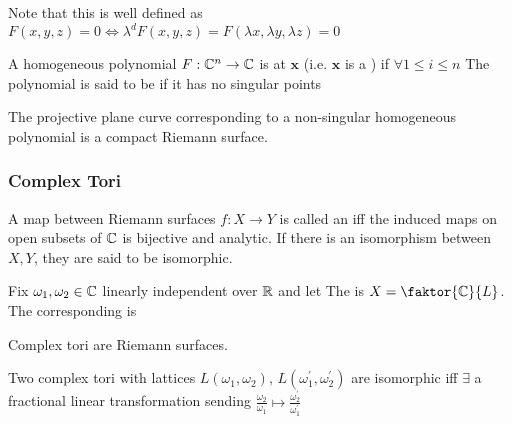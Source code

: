 \documentclass{article}
\begin{document}
\begin{remark}
	Note that this is well defined as $F(x,y,z) = 0 \Leftrightarrow \lambda^d F(x,y,z)=F(\lambda x, \lambda y, \lambda z)=0$
\end{remark}

\begin{definition}
	A homogeneous polynomial $F:\mathbb{C}^n \to \mathbb{C}$ is  at $\bm{x}$ (i.e. $\bm{x}$ is a ) if $\forall 1 \leq i \leq n$
The polynomial is said to be  if it has no singular points
\end{definition}

\begin{prop}
	The projective plane curve corresponding to a non-singular homogeneous polynomial is a compact Riemann surface. 
\end{prop}

\subsubsection{Complex Tori}

\begin{definition}
	A map between Riemann surfaces $f:X \to Y$ is called an  iff the induced maps on open subsets of $\mathbb{C}$ is bijective and analytic. If there is an isomorphism between $X,Y$, they are said to be isomorphic.  
\end{definition}

\begin{definition}
	Fix $\omega_1, \omega_2 \in \mathbb{C}$ linearly independent over $\mathbb{R}$ and let 
The  is $X = \faktor{\mbb{C}}{L}$. The corresponding  is 
\eq{
\mf{F} = \mf{F}(X) = \pbrace{\alpha \omega_1+ \beta \omega_2 \, | \, \alpha,\beta \in [0,1)}
}
\end{definition}

\begin{prop}
	Complex tori are Riemann surfaces. 
\end{prop}

\begin{prop}
	Two complex tori with lattices $L(\omega_1, \omega_2), \, L(\omega_1^\prime, \omega_2^\prime)$ are isomorphic iff $\exists$ a fractional linear transformation sending $\frac{\omega_2}{\omega_1} \mapsto \frac{\omega_2^\prime}{\omega_1^\prime}$
\end{prop}
\end{document}
